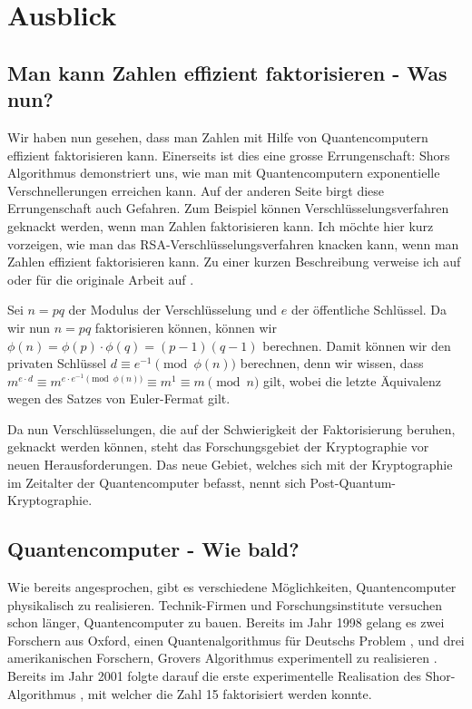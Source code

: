 \chapter{Ausblick}
\section{Man kann Zahlen effizient faktorisieren - Was nun?}
Wir haben nun gesehen, dass man Zahlen mit Hilfe von Quantencomputern effizient faktorisieren kann. Einerseits ist dies eine grosse Errungenschaft: Shors Algorithmus demonstriert uns, wie man mit Quantencomputern exponentielle Verschnellerungen erreichen kann. Auf der anderen Seite birgt diese Errungenschaft auch Gefahren. Zum Beispiel können Verschlüsselungsverfahren geknackt werden, wenn man Zahlen faktorisieren kann. Ich möchte hier kurz vorzeigen, wie man das RSA-Verschlüsselungsverfahren knacken kann, wenn man Zahlen effizient faktorisieren kann. Zu einer kurzen Beschreibung verweise ich auf \cite{rsaintro} oder für die originale Arbeit auf \cite{rsaorig}. 

Sei $n = pq$ der Modulus der Verschlüsselung und $e$ der öffentliche Schlüssel. Da wir nun $n = pq$ faktorisieren können, können wir $\phi(n) = \phi(p)\cdot\phi(q) = (p - 1)(q - 1)$ berechnen. Damit können wir den privaten Schlüssel $d \equiv e^{-1} \pmod{\phi(n)}$ berechnen, denn wir wissen, dass $m^{e\cdot d} \equiv m^{e\cdot e^{-1} \pmod{\phi(n)}} \equiv m^1 \equiv m \pmod{n}$ gilt, wobei die letzte Äquivalenz wegen des Satzes von Euler-Fermat gilt.

Da nun Verschlüsselungen, die auf der Schwierigkeit der Faktorisierung beruhen, geknackt werden können, steht das Forschungsgebiet der Kryptographie vor neuen Herausforderungen. Das neue Gebiet, welches sich mit der Kryptographie im Zeitalter der Quantencomputer befasst, nennt sich Post-Quantum-Kryptographie.

\section{Quantencomputer - Wie bald?}
Wie bereits angesprochen, gibt es verschiedene Möglichkeiten, Quantencomputer physikalisch zu realisieren. Technik-Firmen und Forschungsinstitute versuchen schon länger, Quantencomputer zu bauen. Bereits im Jahr 1998 gelang es zwei Forschern aus Oxford, einen Quantenalgorithmus für Deutschs Problem \cite{qimpdj}, und drei amerikanischen Forschern, Grovers Algorithmus experimentell zu realisieren \cite{qimpgr}. Bereits im Jahr 2001 folgte darauf die erste experimentelle Realisation des Shor-Algorithmus \cite{ShorImp}, mit welcher die Zahl 15 faktorisiert werden konnte.

